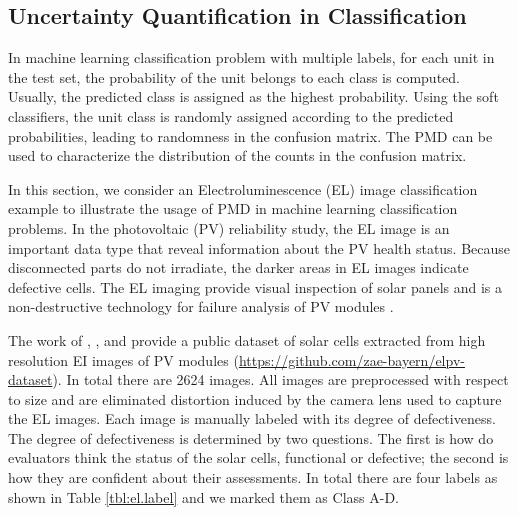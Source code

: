 \documentclass[12pt]{article}
\begin{document}
\subsection{Uncertainty Quantification in Classification}
In machine learning classification problem with multiple labels, for each unit in the test set, the probability of the unit belongs to each class is computed. Usually, the predicted class is assigned as the highest probability. Using the soft classifiers, the unit class is randomly assigned according to the predicted probabilities, leading to randomness in the confusion matrix. The PMD can be used to characterize the distribution of the counts in the confusion matrix.

In this section, we consider an Electroluminescence (EL) image classification example to illustrate the usage of PMD in machine learning classification problems. In the photovoltaic (PV) reliability study, the EL image is an important data type that reveal information about the PV health status. Because disconnected parts do not irradiate, the darker areas in EL images indicate defective cells. The EL imaging provide visual inspection of solar panels and is a non-destructive technology for failure analysis of PV modules .

The work of , , and  provide a public dataset of solar cells extracted from high resolution EI images of PV modules (\url{https://github.com/zae-bayern/elpv-dataset}). In total there are 2624 images. All images are preprocessed with respect to size and are eliminated distortion induced by the camera lens used to capture the EL images. Each image is manually labeled  with its degree of defectiveness. The degree of defectiveness is determined by two questions. The first is how do evaluators think the status of the solar cells, functional or defective; the second is how they are confident about their assessments. In total there are four labels as shown in Table \ref{tbl:el.label} and we marked them as Class A-D.
\end{document}
